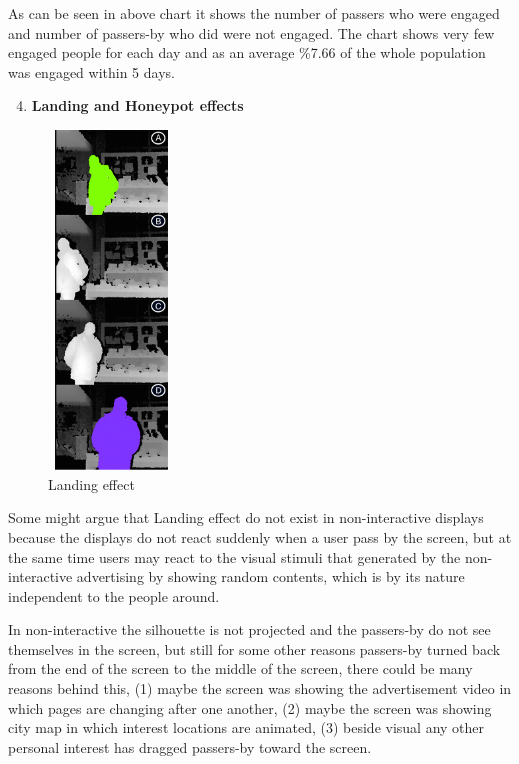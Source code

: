 \begin{enumerate}
As can be seen in above chart it shows the number of passers who were engaged and number of passers-by who did were not engaged. The chart shows very few engaged people for each day and as an average \%7.66 of the whole population was engaged within 5 days.


\end{enumerate}


\newpage
\begin{enumerate}
\setcounter{enumi}{3}
\item \textbf{Landing and Honeypot effects}
\end{enumerate}

\begin{figure}
  \vspace{-20pt}
  \begin{center}
    \includegraphics[width=0.30\textwidth,height=90mm]{figures/8/non_inter_findings/effects/landing}
  \end{center}
  \vspace{-20pt}
  \caption{Landing effect}
  \vspace{20pt}
\end{figure}
Some might argue that Landing\cite{EnticingPeople} effect do not exist in non-interactive displays because the displays do not react suddenly when a user pass by the screen, but at the same time users may react to the visual stimuli that generated by the non-interactive advertising by showing random contents, which is by its nature independent to the people around.

In non-interactive the silhouette is not projected and the passers-by do not see themselves in the screen, but still for some other reasons passers-by turned back from the end of the screen to the middle of the screen, there could be many reasons behind this, (1) maybe the screen was showing the advertisement video in which pages are changing after one another, (2) maybe the screen was showing city map in which interest locations are animated, (3) beside visual any other personal interest has dragged passers-by toward the screen. 


